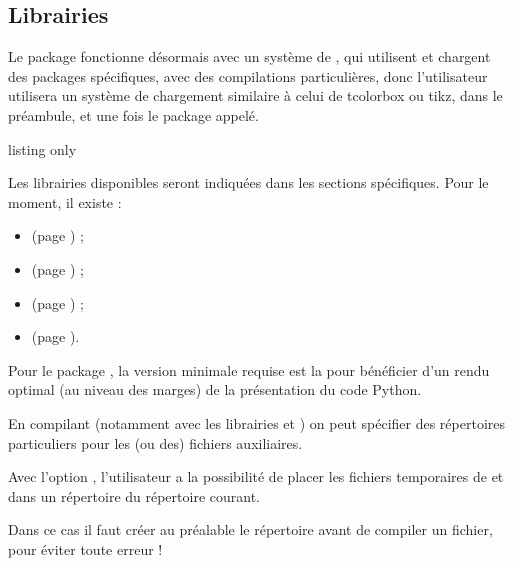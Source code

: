 \pagebreak

\subsection{Librairies}\label{librairies}

\begin{warningblock}
 Le package fonctionne désormais avec un système de , qui utilisent et chargent des packages spécifiques, avec des compilations particulières, donc l'utilisateur utilisera un système de chargement similaire à celui de \textsf{tcolorbox} ou \textsf{tikz}, dans le préambule, et une fois le package appelé.
\end{warningblock}

\begin{PresCodeTexPL}{listing only}
\usepackage{ProfLycee}
\end{PresCodeTexPL}

\begin{noteblock}
Les librairies disponibles seront indiquées dans les sections spécifiques. Pour le moment, il existe :

\begin{itemize}
	\item {} (page \pageref{pythonpiton}) ;
	\item {} (page \pageref{pythontex}) ;
	\item {} (page \pageref{schemasespace}) ;
	\item {} (page \pageref{ecrituresmath}).
\end{itemize}
\vspace*{-\baselineskip}\leavevmode
\end{noteblock}

\begin{warningblock}
 Pour le package , la version minimale requise est la  pour bénéficier d'un rendu optimal (au niveau des marges) de la présentation du code \textsf{Python}.
\end{warningblock}

\begin{noteblock}
En compilant (notamment avec les librairies  et ) on peut spécifier des répertoires particuliers pour les (ou des) fichiers auxiliaires.

Avec l'option , l'utilisateur a la possibilité de placer les fichiers temporaires de  et  dans un répertoire  du répertoire courant.

\smallskip

Dans ce cas il faut créer au préalable le répertoire  avant de compiler un fichier, pour éviter toute erreur !
\end{noteblock}


